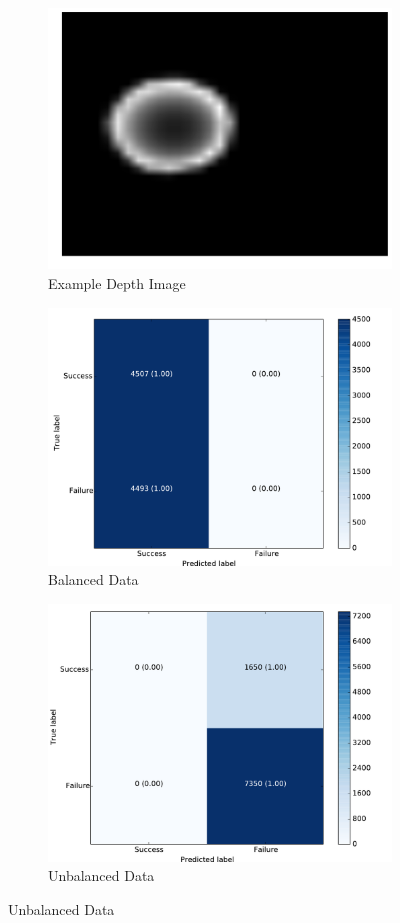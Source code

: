 \begin{figure}[t!]
    \begin{subfigure}[t]{0.24\textwidth}
        \includegraphics[width=0.75\columnwidth]{figs/depth_example.pdf} \caption{Example Depth Image} \label{fig:depth_image}
        \end{subfigure}
    \begin{subfigure}[t]{0.24\textwidth}
        \includegraphics[width=0.9\columnwidth]{figs/balanced_results.pdf} \caption{Balanced Data} \label{fig:balanced_confusion}
    \end{subfigure}
		\begin{subfigure}[t]{0.24\textwidth}
        \includegraphics[width=0.9\columnwidth]{figs/unbalanced_results.pdf} \caption{Unbalanced Data} \label{fig:unbalanced_confusion}

\end{subfigure}
\end{figure}
